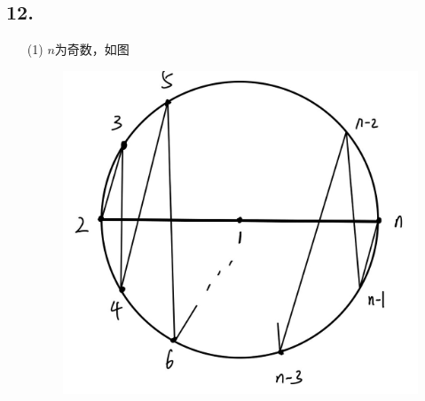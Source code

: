 \documentclass{article}
\begin{document}
\subsection*{12.}
\begin{enumerate}
    \item [(1)]$n$为奇数，如图
    \begin{figure}[htbp]
        \centering
        \includegraphics[scale=0.3]{t121.jpg}
    \end{figure}


\end{enumerate}
\end{document}
